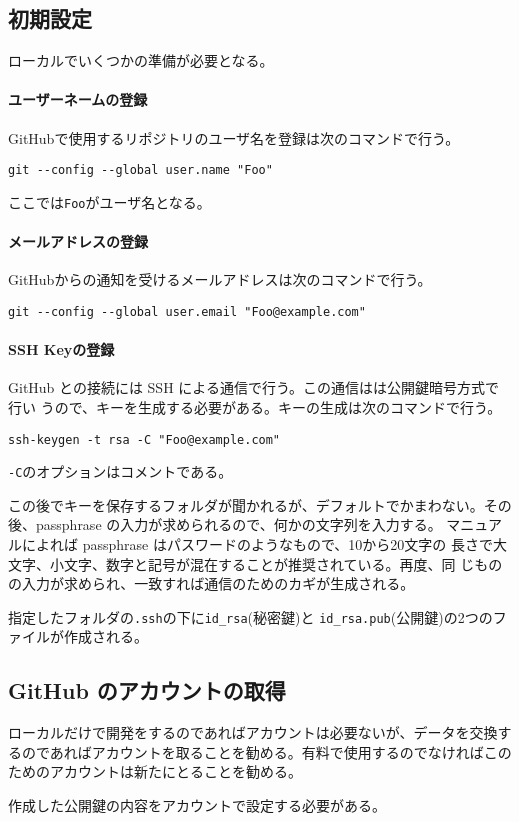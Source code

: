 \subsection{初期設定}
ローカルでいくつかの準備が必要となる。

\paragraph{ユーザーネームの登録}
GitHubで使用するリポジトリのユーザ名を登録は次のコマンドで行う。

\Verb+git --config --global user.name "Foo"+

ここでは\Verb+Foo+がユーザ名となる。
\paragraph{メールアドレスの登録}
GitHubからの通知を受けるメールアドレスは次のコマンドで行う。

\Verb+git --config --global user.email "Foo@example.com"+
\paragraph{SSH Keyの登録}
GitHub との接続には SSH による通信で行う。この通信はは公開鍵暗号方式で行い
うので、キーを生成する必要がある。キーの生成は次のコマンドで行う。

\Verb+ssh-keygen -t rsa -C "Foo@example.com"+

\Verb+-C+のオプションはコメントである。 

この後でキーを保存するフォルダが聞かれるが、デフォルトでかまわない。その
後、passphrase の入力が求められるので、何かの文字列を入力する。
マニュアルによれば passphrase はパスワードのようなもので、10から20文字の
長さで大文字、小文字、数字と記号が混在することが推奨されている。再度、同
じものの入力が求められ、一致すれば通信のためのカギが生成される。

指定したフォルダの\Verb+.ssh+の下に\Verb+id_rsa+(秘密鍵)と
\Verb+id_rsa.pub+(公開鍵)の2つのファイルが作成される。 

\subsection{GitHub のアカウントの取得}
ローカルだけで開発をするのであればアカウントは必要ないが、データを交換す
るのであればアカウントを取ることを勧める。有料で使用するのでなければこの
ためのアカウントは新たにとることを勧める。

作成した公開鍵の内容をアカウントで設定する必要がある。

